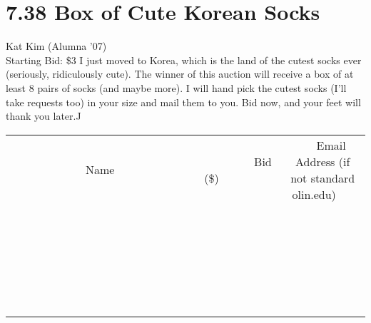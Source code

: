 \documentclass[11pt]{article}
\begin{document}
\section*{7.38 Box of Cute Korean Socks}
Kat Kim (Alumna '07)
\\
Starting Bid: \$3
\newline
I just moved to Korea, which is the land of the cutest socks ever (seriously, ridiculously cute). The winner of this auction will receive a box of at least 8 pairs of socks (and maybe more). I will hand pick the cutest socks (I'll take requests too) in your size and mail them to you. Bid now, and your feet will thank you later.^^
\\[6ex]
\begin{tabular}{c c c}
~~~~~~~~~~~~~Name~~~~~~~~~~~~~ & ~~~~~~~~~Bid (\$)~~~~~~~~~  & ~~~Email Address (if not standard olin.edu)~~~\\
 & & \\
\hline
 & & \\
\hline
 & & \\
\hline
 & & \\
\hline
 & & \\
\hline
 & & \\
\hline
 & & \\
\hline
 & & \\
\hline
 & & \\
\hline
 & & \\
\hline
 & & \\
\hline
 & & \\
\hline
 & & \\
\hline
 & & \\
\hline
 & & \\
\hline
 & & \\
\hline
 & & \\
\hline
 & & \\
\hline
 & & \\
\hline
 & & \\
\hline
 & & \\
\hline
 & & \\
\hline
 & & \\
\hline
 & & \\
\hline
 & & \\
\hline
 & & \\
\hline
\end{tabular}
\newpage
\end{document}

